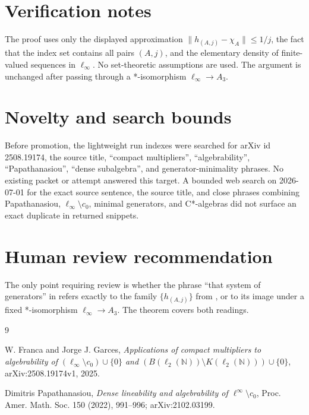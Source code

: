 \documentclass[11pt]{article}
\begin{document}
\section*{Verification notes}

The proof uses only the displayed approximation
\(\|h_{(A,j)}-\chi_A\|\leq 1/j\), the fact that the index set contains all
pairs \((A,j)\), and the elementary density of finite-valued sequences in
\(\ell_\infty\).  No set-theoretic assumptions are used.  The argument is
unchanged after passing through a *-isomorphism \(\ell_\infty\to A_3\).

\section*{Novelty and search bounds}

Before promotion, the lightweight run indexes were searched for arXiv id
2508.19174, the source title, ``compact multipliers'', ``algebrability'',
``Papathanasiou'', ``dense subalgebra'', and generator-minimality phrases.
No existing packet or attempt answered this target.  A bounded web search on
2026-07-01 for the exact source sentence, the source title, and close phrases
combining Papathanasiou, \(\ell_\infty\setminus c_0\), minimal generators,
and C*-algebras did not surface an exact duplicate in returned snippets.

\section*{Human review recommendation}

The only point requiring review is whether the phrase ``that system of
generators'' in \cite{FrancaGarces} refers exactly to the family
\(\{h_{(A,j)}\}\) from \cite{Papathanasiou}, or to its image under a fixed
*-isomorphism \(\ell_\infty\to A_3\).  The theorem covers both readings.

\begin{thebibliography}{9}

W. Franca and Jorge J. Garces,
\emph{Applications of compact multipliers to algebrability of
\((\ell_{\infty}\setminus c_0)\cup\{0\}\) and
\((B(\ell_2(\mathbb N))\setminus K(\ell_2(\mathbb N)))\cup\{0\}\)},
arXiv:2508.19174v1, 2025.

Dimitris Papathanasiou,
\emph{Dense lineability and algebrability of
\(\ell^\infty\setminus c_0\)},
Proc. Amer. Math. Soc. 150 (2022), 991--996; arXiv:2102.03199.

\end{thebibliography}
\end{document}
